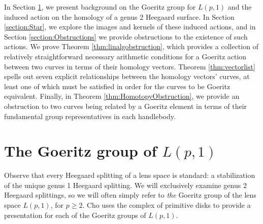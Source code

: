 \documentclass{amsart}     %
\theoremstyle{definition}
\begin{document}
In Section \ref{section:GoeritzGroupLp1}, we present background on the Goeritz group for $L(p,1)$ and the induced action on the homology of a genus 2 Heegaard surface. In Section \ref{section:Star}, we explore the images and kernels of these induced actions, and in Section \ref{section:Obstructions} we provide obstructions to the existence of such actions. We prove Theorem \ref{thm:linalgobstruction}, which provides a collection of relatively straightforward necessary arithmetic conditions for a Goeritz action between two curves in terms of their homology vectors. Theorem \ref{thm:vectorlist} spells out seven explicit relationships between the homology vectors' curves, at least one of which must be satisfied in order for the curves to be Goeritz equivalent. Finally, in Theorem \ref{thm:HomotopyObstruction}, we provide an obstruction to two curves being related by a Goeritz element in terms of their fundamental group representatives in each handlebody.

\section{The Goeritz group of $L(p, 1)$}
\label{section:GoeritzGroupLp1}

Observe that every Heegaard splitting of a lens space is standard: a stabilization of the unique genus 1 Heegaard splitting. We will exclusively examine genus 2 Heegaard splittings, so we will often simply refer to \emph{the} Goeritz group of the lens space $L(p,1)$, for $p \geq 2$. Cho uses the complex of primitive disks to provide a presentation for each of the Goeritz groups of $L(p,1)$.
\end{document}
